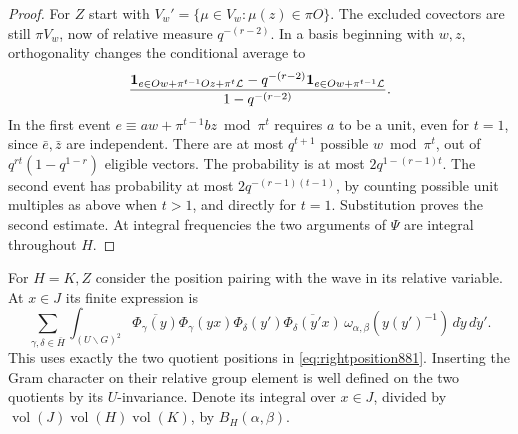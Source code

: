 \documentclass[a4paper,11pt]{article}
\theoremstyle{definition}
\theoremstyle{remark}
\numberwithin{equation}{section}
\begin{document}
\begin{proof}
For \(Z\) start with \(V_w'=\{\mu\in V_w:\mu(z)\in\pi O\}\).
The excluded covectors are still \(\pi V_w\), now of relative
measure \(q^{-(r-2)}\). In a basis beginning with \(w,z\),
orthogonality changes the conditional average to
\[
 \frac{{\bf1}_{e\in O w+\pi^{t-1}O z+\pi^t\mathcal L}
       -q^{-(r-2)}{\bf1}_{e\in O w+\pi^{t-1}\mathcal L}}
      {1-q^{-(r-2)}} .
\]
In the first event \(e\equiv a w+\pi^{t-1}b z\bmod\pi^t\)
requires \(a\) to be a unit, even for \(t=1\), since
\(\bar e,\bar z\) are independent. There are at most \(q^{t+1}\)
possible \(w\bmod\pi^t\), out of
\(q^{rt}(1-q^{1-r})\) eligible vectors. The probability is at
most \(2q^{1-(r-1)t}\). The second event has probability at most
\(2q^{-(r-1)(t-1)}\), by counting possible unit multiples as
above when \(t>1\), and directly for \(t=1\).
Substitution proves the second estimate. At integral frequencies
the two arguments of \(\Psi\) are integral throughout \(H\).
\end{proof}

For \(H=K,Z\) consider the position pairing with the wave in
its relative variable. At \(x\in J\) its finite expression is
\[
 \sum_{\gamma,\delta\in\bar H}
 \int_{(U\backslash G)^2}
   \overline{\Phi_\gamma(y)}\Phi_\gamma(yx)
   \Phi_\delta(y')\overline{\Phi_\delta(y'x)}
   \,\omega_{\alpha,\beta}(y(y')^{-1})\,d\dot y\,d\dot y'.
\]
This uses exactly the two quotient positions in
\eqref{eq:rightposition881}. Inserting the Gram character on
their relative group element is well defined on the two
quotients by its \(U\)-invariance. Denote its integral over
\(x\in J\), divided by
\(\operatorname{vol}(J)\operatorname{vol}(H)\operatorname{vol}(K)\),
by \(B_H(\alpha,\beta)\).
\end{document}
